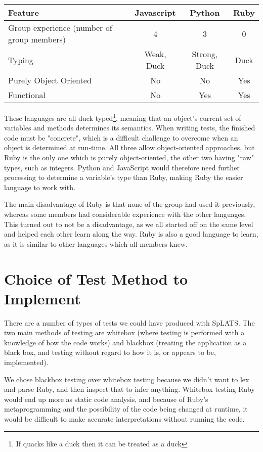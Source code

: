   \begin{tabular}{| l | c | c | c |}
  \hline
  \textbf{Feature} & \textbf{Javascript} & \textbf{Python} & \textbf{Ruby} \\
  \hline
  Group experience (number of group members) & 4 & 3 & 0 \\
  \hline
  Typing & Weak, Duck & Strong, Duck & Duck \\
  \hline
  Purely Object Oriented & No & No & Yes \\
  \hline
  Functional & No & Yes & Yes \\
  \hline
  \end{tabular}
  
These languages are all duck typed\footnote{If quacks like a duck then it can be treated as a duck}, meaning that an object's current set of variables and methods determines its semantics. When writing tests, the finished code must be "concrete", which is a difficult challenge to overcome when an object is determined at run-time.
All three allow object-oriented approaches, but Ruby is the only one which is purely object-oriented, the other two having "raw" types, such as integers. Python and JavaScript would therefore need further processing to determine a variable's type than Ruby, making Ruby the easier language to work with.

The main disadvantage of Ruby is that none of the group had used it previously, whereas some members had considerable experience with the other languages. This turned out to not be a disadvantage, as we all started off on the same level and helped each other learn along the way. Ruby is also a good language to learn, as it is similar to other languages which all members knew.

\section{Choice of Test Method to Implement}
  There are a number of types of tests we could have produced with SpLATS.
  The two main methods of testing are whitebox (where testing is performed
  with a knowledge of how the code works) and blackbox (treating the
  application as a black box, and testing without regard to how it is, or
  appears to be, implemented).

  We chose blackbox testing over whitebox testing because we didn't want to lex and parse Ruby, and then inspect that to infer anything. Whitebox testing Ruby would end up more as static code analysis, and because of Ruby's metaprogramming and the possibility of the code being changed at runtime, it would be difficult to make accurate interpretations without running the code.

